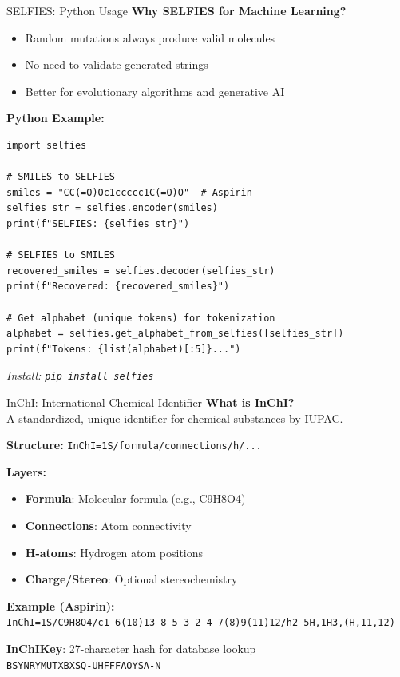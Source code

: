 \documentclass{beamer}
\begin{document}
\begin{frame}[fragile]{SELFIES: Python Usage}
    \small
    \textbf{Why SELFIES for Machine Learning?}
    \begin{itemize}
        \item Random mutations always produce valid molecules
        \item No need to validate generated strings
        \item Better for evolutionary algorithms and generative AI
    \end{itemize}
    \vspace{0.3em}
    
    \textbf{Python Example:}
    \begin{lstlisting}[style=codeStyle, basicstyle=\ttfamily\scriptsize]
import selfies

# SMILES to SELFIES
smiles = "CC(=O)Oc1ccccc1C(=O)O"  # Aspirin
selfies_str = selfies.encoder(smiles)
print(f"SELFIES: {selfies_str}")

# SELFIES to SMILES
recovered_smiles = selfies.decoder(selfies_str)
print(f"Recovered: {recovered_smiles}")

# Get alphabet (unique tokens) for tokenization
alphabet = selfies.get_alphabet_from_selfies([selfies_str])
print(f"Tokens: {list(alphabet)[:5]}...")
    \end{lstlisting}
    
    \vspace{0.2em}
    \textit{Install: \texttt{pip install selfies}}
\end{frame}

\begin{frame}{InChI: International Chemical Identifier}
    \small
    \textbf{What is InChI?}\\
    A standardized, unique identifier for chemical substances by IUPAC.
    \vspace{0.5em}
    
    \textbf{Structure:} \texttt{InChI=1S/formula/connections/h/...}
    \vspace{0.3em}
    
    \textbf{Layers:}
    \begin{itemize}
        \item \textbf{Formula}: Molecular formula (e.g., C9H8O4)
        \item \textbf{Connections}: Atom connectivity
        \item \textbf{H-atoms}: Hydrogen atom positions
        \item \textbf{Charge/Stereo}: Optional stereochemistry
    \end{itemize}
    \vspace{0.3em}
    
    \textbf{Example (Aspirin):}\\
    \texttt{\footnotesize InChI=1S/C9H8O4/c1-6(10)13-8-5-3-2-4-7(8)9(11)12/h2-5H,1H3,(H,11,12)}
    \vspace{0.3em}
    
    \textbf{InChIKey}: 27-character hash for database lookup\\
    \texttt{BSYNRYMUTXBXSQ-UHFFFAOYSA-N}
\end{frame}
\end{document}
